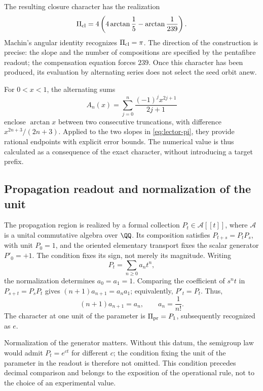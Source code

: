 The resulting closure character has the realization
\begin{equation}
 \Pi_{\rm cl}=4\left(4\arctan\frac15-\arctan\frac1{239}\right).
 \label{eq:lector-pi}
\end{equation}
Machin's angular identity recognizes \(\Pi_{\rm cl}=\pi\). The direction of the construction is precise: the slope and the number of compositions are specified by the pentafibre readout; the compensation equation forces \(239\). Once this character has been produced, its evaluation by alternating series does not select the seed orbit anew.

For \(0<x<1\), the alternating sums
\[
 A_n(x)=\sum_{j=0}^n\frac{(-1)^jx^{2j+1}}{2j+1}
\]
enclose \(\arctan x\) between two consecutive truncations, with difference \(x^{2n+3}/(2n+3)\). Applied to the two slopes in \eqref{eq:lector-pi}, they provide rational endpoints with explicit error bounds. The numerical value is thus calculated as a consequence of the exact character, without introducing a target prefix.

\subsection{Propagation readout and normalization of the unit}

The propagation region is realized by a formal collection \(P_t\in\mathcal A[[t]]\), where \(\mathcal A\) is a unital commutative algebra over \(\QQ\). Its composition satisfies \(P_{t+s}=P_tP_s\), with unit \(P_0=1\), and the oriented elementary transport fixes the scalar generator \(P'_0=+1\). The condition fixes its sign, not merely its magnitude. Writing
\[
 P_t=\sum_{n\ge0}a_nt^n,
\]
the normalization determines \(a_0=a_1=1\). Comparing the coefficient of \(s^nt\) in \(P_{s+t}=P_sP_t\) gives \((n+1)a_{n+1}=a_na_1\); equivalently, \(P'_t=P_t\). Thus,
\begin{equation}
 (n+1)a_{n+1}=a_n,\qquad a_n=\frac1{n!}.
 \label{eq:propagacion}
\end{equation}
The character at one unit of the parameter is \(\Pi_{\rm pr}=P_1\), subsequently recognized as \(e\).

Normalization of the generator matters. Without this datum, the semigroup law would admit \(P_t=e^{ct}\) for different \(c\); the condition fixing the unit of the parameter in the readout is therefore not omitted. This condition precedes decimal comparison and belongs to the exposition of the operational rule, not to the choice of an experimental value.

